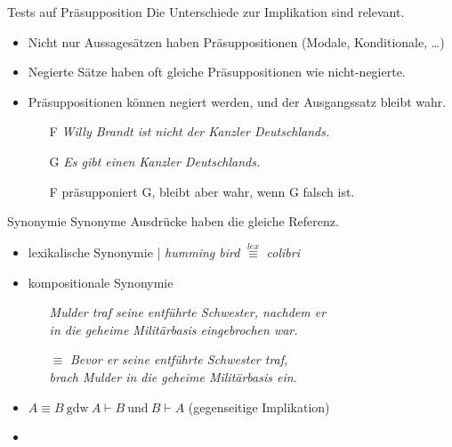 \begin{frame}
  {Tests auf Präsupposition}
  \onslide<+->
  \onslide<+->
  Die Unterschiede zur Implikation sind relevant.\\
  \Halbzeile
  \begin{itemize}[<+->]
    \item Nicht nur Aussagesätzen haben Präsuppositionen (Modale, Konditionale, \ldots)
    \item Negierte Sätze haben oft gleiche Präsuppositionen wie nicht-negierte.
    \item Präsuppositionen können negiert werden, und der Ausgangssatz bleibt wahr.\\
      \begin{itemize}[<+->]
        \item[F] \textit{Willy Brandt ist nicht der Kanzler Deutschlands.}
        \item[G] \textit{Es gibt einen Kanzler Deutschlands.}
        \item[ ] F präsupponiert G, bleibt aber wahr, wenn G falsch ist.
      \end{itemize}
  \end{itemize}
\end{frame}

\begin{frame}
  {Synonymie}
  \onslide<+->
  \onslide<+->
  Synonyme Ausdrücke haben  \alert{die gleiche Referenz}.\\
  \Halbzeile
  \begin{itemize}[<+->]
    \item lexikalische Synonymie | \textit{humming bird} $\stackrel{lex}{\equiv}$ \textit{colibri}
      \Halbzeile
    \item kompositionale Synonymie
      \begin{itemize}[<+->]
        \item[ ] \textit{Mulder traf seine entführte Schwester, nachdem er\\
          in die geheime Militärbasis eingebrochen war.}
        \item[$\equiv$] \textit{Bevor er seine entführte Schwester traf,\\
          brach Mulder in die geheime Militärbasis ein.}
      \end{itemize}
    \Halbzeile
    \item \alert{$A\equiv B\ \text{gdw}\ A\vdash B\ \text{und}\ B\vdash A$} (gegenseitige Implikation)
    \item {}
  \end{itemize}
\end{frame}

